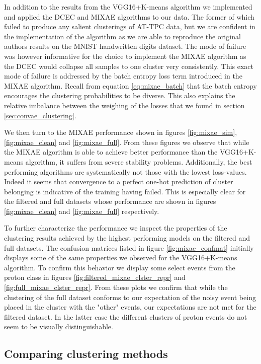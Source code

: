 In addition to the results from the VGG16+K-means algorithm we implemented and applied the DCEC and MIXAE algorithms to our data. The former of which failed to produce any salient clusterings of AT-TPC data, but we are confident in the implementation of the algorithm as we are able to reproduce the original authors results on the MNIST handwritten digits dataset. The mode of failure was however informative for the choice to implement the MIXAE algorithm as the DCEC would collapse all samples to one cluster very consistently. This exact mode of failure is addressed by the batch entropy loss term introduced in the MIXAE algorithm. Recall from equation \ref{eq:mixae_batch} that the batch entropy encourages the clustering probabilities to be diverse. This also explains the relative imbalance between the weighing of the losses that we found in section \ref{sec:convae_clustering}.

We then turn to the MIXAE performance shown in figures \ref{fig:mixae_sim}, \ref{fig:mixae_clean} and \ref{fig:mixae_full}. From these figures we observe that while the MIXAE algorithm is able to achieve better performance than the VGG16+K-means algorithm, it suffers from severe stability problems. Additionally, the best performing algorithms are systematically not those with the lowest loss-values. Indeed it seems that convergence to a perfect one-hot prediction of cluster belonging is indicative of the training having failed. This is especially clear for the filtered and full datasets whose performance are shown in figures \ref{fig:mixae_clean} and \ref{fig:mixae_full} respectively.

To further characterize the performance we inspect the properties of the clustering results achieved by the highest performing models on the filtered and full datasets. The confusion matrices listed in figure \ref{fig:mixae_confmat} initially displays some of the same properties we observed for the VGG16+K-means algorithm. To confirm this behavior we display some select events from the proton class in figures \ref{fig:filtered_mixae_clster_repr} and \ref{fig:full_mixae_clster_repr}. From these plots we confirm that while the clustering of the full dataset conforms to our expectation of the noisy event being placed in the cluster with the "other" events, our expectations are not met for the filtered dataset. In the latter case the different clusters of proton events do not seem to be visually distinguishable.

\subsection{Comparing clustering methods}

